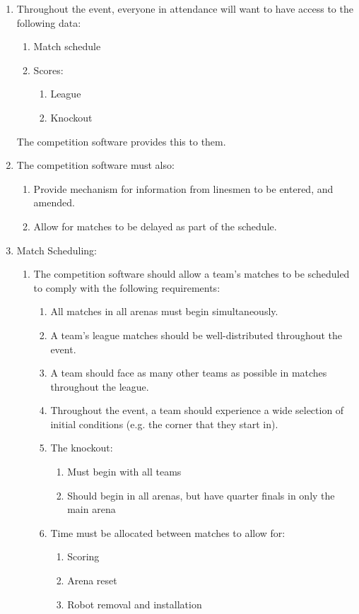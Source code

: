 \begin{enumerate}
\item Throughout the event, everyone in attendance will want to have access to the following data:
  \begin{enumerate}
  \item Match schedule
  \item Scores:
    \begin{enumerate}
    \item League
    \item Knockout
    \end{enumerate}
  \end{enumerate}
  The competition software provides this to them.

\item The competition software must also:
  \begin{enumerate}
  \item Provide mechanism for information from linesmen to be entered, and amended.
  \item Allow for matches to be delayed as part of the schedule.
  \end{enumerate}

\item Match Scheduling:
  \begin{enumerate}
  \item The competition software should allow a team's matches to be scheduled to comply with the following requirements:
    \begin{enumerate}
    \item All matches in all arenas must begin simultaneously.
    \item A team's league matches should be well-distributed throughout the event.
    \item A team should face as many other teams as possible in matches throughout the league.
    \item Throughout the event, a team should experience a wide selection of initial conditions (e.g. the corner that they start in).
    \item The knockout:
      \begin{enumerate}
      \item Must begin with all teams
      \item Should begin in all arenas, but have quarter finals in only the main arena
      \end{enumerate}
    \item Time must be allocated between matches to allow for:
      \begin{enumerate}
      \item Scoring
      \item Arena reset
      \item Robot removal and installation
      \end{enumerate}
    \end{enumerate}
  \end{enumerate}

\end{enumerate}








